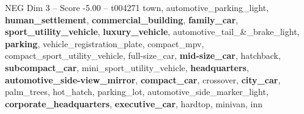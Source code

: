 \begin{textsample}{NEG Dim 3 – Score -5.00 – t004271}  \label{ex:f3_neg_025}
town, automotive\_parking\_light, \textbf{human\_settlement}, \textbf{commercial\_building}, \textbf{family\_car}, \textbf{sport\_utility\_vehicle}, \textbf{luxury\_vehicle}, automotive\_tail\_\&\_brake\_light, \textbf{parking}, vehicle\_registration\_plate, compact\_mpv, compact\_sport\_utility\_vehicle, full-size\_car, \textbf{mid-size\_car}, hatchback, \textbf{subcompact\_car}, mini\_sport\_utility\_vehicle, \textbf{headquarters}, \textbf{automotive\_side-view\_mirror}, \textbf{compact\_car}, crossover, \textbf{city\_car}, palm\_trees, hot\_hatch, parking\_lot, automotive\_side\_marker\_light, \textbf{corporate\_headquarters}, \textbf{executive\_car}, hardtop, minivan, inn

\end{textsample}

